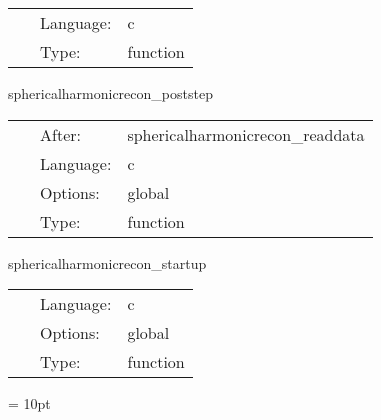 \begin{tabular*}{160mm}{cll} 
~ & Language:  & c \\ 
~ & Type:  & function \\ 
\end{tabular*} 


\vspace{5mm}


\hspace{5mm} sphericalharmonicrecon\_poststep 

\hspace{5mm}{\it set data flag to unread } 


\hspace{5mm}

 \begin{tabular*}{160mm}{cll} 
~ & After:  & sphericalharmonicrecon\_readdata \\ 
~ & Language:  & c \\ 
~ & Options:  & global \\ 
~ & Type:  & function \\ 
\end{tabular*} 


\vspace{5mm}


\hspace{5mm} sphericalharmonicrecon\_startup 

\hspace{5mm}{\it startup } 


\hspace{5mm}

 \begin{tabular*}{160mm}{cll} 
~ & Language:  & c \\ 
~ & Options:  & global \\ 
~ & Type:  & function \\ 
\end{tabular*} 



\vspace{5mm}\parskip = 10pt 
